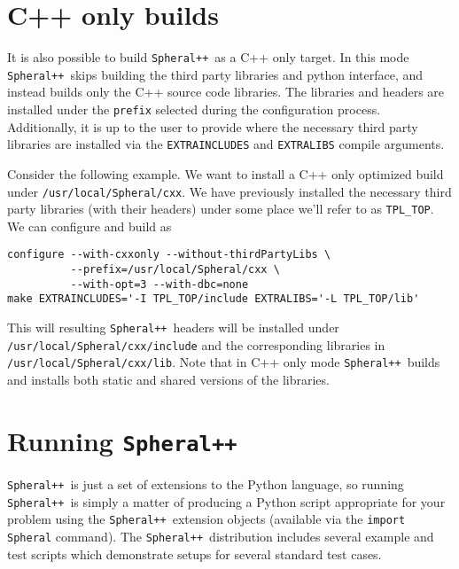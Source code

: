 \documentclass{article}
\newcommand{\Spheral}{{\tt Spheral++}}
\begin{document}
\section{C++ only builds}

It is also possible to build \Spheral\ as a C++ only target.  In this mode
\Spheral\ skips building the third party libraries and python interface, and
instead builds only the C++ source code libraries.  The libraries and headers
are installed under the \verb.prefix. selected during the configuration process.
Additionally, it is up to the user to provide where the necessary third party
libraries are installed via the \verb.EXTRAINCLUDES. and
\verb.EXTRALIBS. compile arguments.

Consider the following example.  We want to install a C++ only optimized build under
\verb./usr/local/Spheral/cxx..  We have previously installed the necessary
third party libraries (with their headers) under some place we'll refer to as
\verb.TPL_TOP..  We can configure and build as

\begin{verbatim}
configure --with-cxxonly --without-thirdPartyLibs \
          --prefix=/usr/local/Spheral/cxx \
          --with-opt=3 --with-dbc=none 
make EXTRAINCLUDES='-I TPL_TOP/include EXTRALIBS='-L TPL_TOP/lib'
\end{verbatim}

This will resulting \Spheral\ headers will be installed under
\verb./usr/local/Spheral/cxx/include. and the corresponding libraries in
\verb./usr/local/Spheral/cxx/lib..  Note that in C++ only mode \Spheral\ builds
and installs both static and shared versions of the libraries.

\section{Running \Spheral}
\Spheral\ is just a set of extensions to the Python language, so running
\Spheral\ is simply a matter of producing a Python script appropriate for your
problem using the \Spheral\ extension objects (available via the
\verb+import Spheral+ command).  The \Spheral\ distribution includes several
example and test scripts which demonstrate setups for several standard test
cases.
\end{document}

